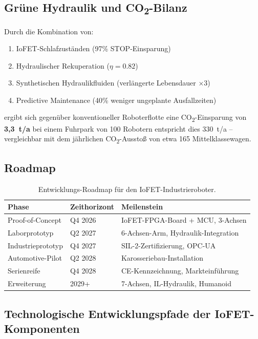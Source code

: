 ﻿\documentclass[a4paper,12pt]{scrreprt}
\theoremstyle{definition}
\begin{document}
\subsection{Grüne Hydraulik und CO\textsubscript{2}-Bilanz}

Durch die Kombination von:
\begin{enumerate}
  \item IoFET-Schlafzuständen (97\% STOP-Einsparung)
  \item Hydraulischer Rekuperation ($\eta = 0.82$)
  \item Synthetischen Hydraulikfluiden (verlängerte Lebensdauer $\times$3)
  \item Predictive Maintenance (40\% weniger ungeplante Ausfallzeiten)
\end{enumerate}
ergibt sich gegenüber konventioneller Roboterflotte eine
CO\textsubscript{2}-Einsparung von \textbf{3{,}3~t/a}
bei einem Fuhrpark von 100 Robotern entspricht dies
330~t/a -- vergleichbar mit dem jährlichen
CO\textsubscript{2}-Ausstoß von etwa 165 Mittelklassewagen.

\subsection{Roadmap}

\begin{table}[H]
\centering
\caption{Entwicklungs-Roadmap für den IoFET-Industrieroboter.}
\label{tab:roadmap}
\small
\begin{tabular}{|l|l|l|}
\hline
\rowcolor{iofetblue!20}
\textbf{Phase} & \textbf{Zeithorizont} & \textbf{Meilenstein} \\
\hline
Proof-of-Concept & Q4 2026 & IoFET-FPGA-Board + MCU, 3-Achsen \\
\hline
Laborprototyp & Q2 2027 & 6-Achsen-Arm, Hydraulik-Integration \\
\hline
Industrieprototyp & Q4 2027 & SIL-2-Zertifizierung, OPC-UA \\
\hline
Automotive-Pilot & Q2 2028 & Karosseriebau-Installation \\
\hline
Serienreife & Q4 2028 & CE-Kennzeichnung, Markteinführung \\
\hline
Erweiterung & 2029+ & 7-Achsen, IL-Hydraulik, Humanoid \\
\hline
\end{tabular}
\end{table}

\subsection{Technologische Entwicklungspfade der IoFET-Komponenten}
\end{document}

